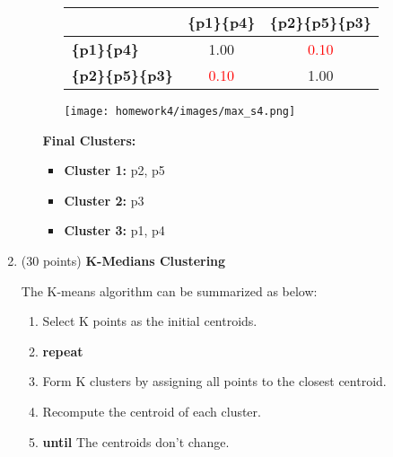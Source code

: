 \documentclass[11pt]{article}
\begin{document}
\begin{enumerate}
\begin{enumerate}
\begin{itemize}
\begin{table}[H]
        \centering
        \begin{minipage}{0.85\textwidth}  %
            \centering
            \begin{minipage}{0.5\textwidth}
                \centering
                \label{tb:exp1}
                \begin{tabular}{ l| c | c}\hline
                           & \textbf{\{p1\}}\textbf{\{p4\}} & \textbf{\{p2\}}\textbf{\{p5\}}\textbf{\{p3\}} \\ \hline
                    \bf \{p1\}\{p4\}                & 1.00        & \textcolor{red}{0.10} \\
                    \bf \{p2\}\{p5\}\{p3\} & \textcolor{red}{0.10}        & 1.00 \\
                    \hline
                \end{tabular}
            \end{minipage}%
            \hfill
            \begin{minipage}{0.28\textwidth}
                \centering
                \texttt{[image: homework4/images/max\_s4.png]}
                \label{fig:your-image}
            \end{minipage}
        \end{minipage}
    \end{table}
    
    \end{itemize}

    \textbf{Final Clusters:}
    \begin{itemize}
        \item \textbf{Cluster 1:} {p2, p5}
        \item \textbf{Cluster 2:} {p3}
        \item \textbf{Cluster 3:} {p1, p4}\\
    \end{itemize}
    \end{enumerate}

    \item (30 points) \textbf{K-Medians Clustering}
    
    The K-means algorithm can be summarized as below:
    \begin{enumerate}
        \item Select K points as the initial centroids.
        \item \textbf{repeat}
        \item \;\;\;\; Form K clusters by assigning all points to the closest centroid.
        \item \;\;\;\; Recompute the centroid of each cluster.
        \item \textbf{until} The centroids don't change.
    \end{enumerate}


\end{enumerate}
\end{document}
